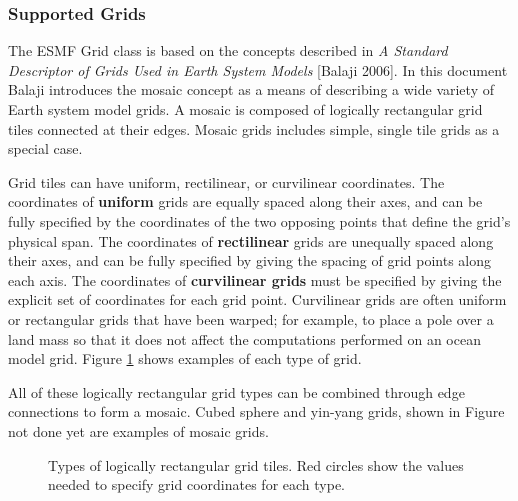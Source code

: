 \subsubsection{Supported Grids}

The ESMF Grid class is based on the concepts described in {\it A Standard Descriptor 
of Grids Used in Earth System Models} [Balaji 2006].  In this document
Balaji introduces the mosaic concept as a means of describing a wide variety of
Earth system model grids.  A mosaic is composed of logically rectangular
grid tiles connected at their edges.  Mosaic grids includes simple,
single tile grids as a special case.

Grid tiles can have uniform, rectilinear, or curvilinear
coordinates.  The coordinates of {\bf uniform} grids are equally spaced along their
axes, and can be fully specified by the coordinates of the two opposing points
that define the grid's physical span.  The coordinates of {\bf rectilinear} grids
are unequally spaced along their axes, and can be fully specified by giving
the spacing of grid points along each axis.  The coordinates of {\bf curvilinear 
grids} must be specified by giving the explicit set of coordinates for each
grid point.  Curvilinear grids are often uniform or rectangular grids that 
have been warped; for example, to place a pole over a land mass so that it
does not affect the computations performed on an ocean model grid.  Figure
\ref{fig:LogRectGrids} shows examples of each type of grid.

All of these logically rectangular grid types can be combined through edge
connections to form a mosaic.  Cubed sphere and yin-yang grids, shown in 
Figure {not done yet} are examples of mosaic grids.
 
\begin{figure}
\caption{Types of logically rectangular grid tiles.  Red circles show the
values needed to specify grid coordinates for each type.}
\label{fig:LogRectGrids}
\end{figure}

